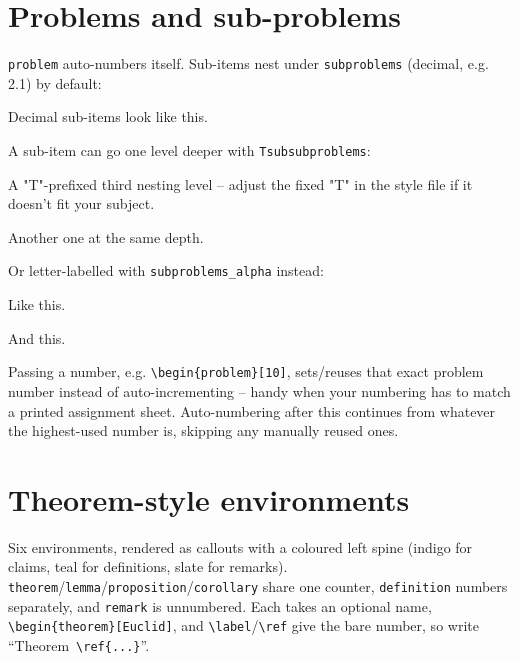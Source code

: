 \documentclass[a4paper, 10pt]{article}
\begin{document}
\section{Problems and sub-problems}
\begin{problem}
\verb|problem| auto-numbers itself. Sub-items nest under \verb|subproblems|
(decimal, e.g. 2.1) by default:
\begin{subproblems}
	\item Decimal sub-items look like this.
	\item A sub-item can go one level deeper with \verb|Tsubsubproblems|:
	      \begin{Tsubsubproblems}
		      \item A "T"-prefixed third nesting level -- adjust the fixed "T" in
		            the style file if it doesn't fit your subject.
		      \item Another one at the same depth.
	      \end{Tsubsubproblems}
\end{subproblems}
Or letter-labelled with \verb|subproblems_alpha| instead:
\begin{subproblems_alpha}
	\item Like this.
	\item And this.
\end{subproblems_alpha}
\end{problem}

\begin{problem}[10]
Passing a number, e.g. \verb|\begin{problem}[10]|, sets/reuses that exact
problem number instead of auto-incrementing -- handy when your numbering has
to match a printed assignment sheet. Auto-numbering after this continues from
whatever the highest-used number is, skipping any manually reused ones.
\end{problem}

\section{Theorem-style environments}
Six environments, rendered as callouts with a coloured left spine (indigo for
claims, teal for definitions, slate for remarks).
\texttt{theorem}/\texttt{lemma}/\texttt{proposition}/\texttt{corollary} share
one counter, \texttt{definition} numbers separately, and \texttt{remark} is
unnumbered. Each takes an optional name, \verb|\begin{theorem}[Euclid]|, and
\verb|\label|/\verb|\ref| give the bare number, so write
``Theorem~\verb|\ref{...}|''.
\end{document}
